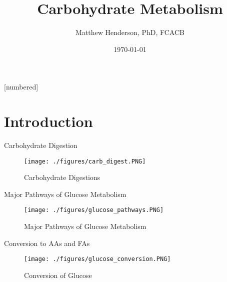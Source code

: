 \documentclass[presentation, smaller]{beamer}
\author{Matthew Henderson, PhD, FCACB}
\date{\today}
\title{Carbohydrate Metabolism}
\institute[NSO]{Newborn Screening Ontario | The University of Ottawa}
\begin{document}
\maketitle


\vspace{220pt}
\beamertemplatenavigationsymbolsempty
{}[numbered]

\section{Introduction}
\label{sec:orgfc30a68}
\begin{frame}[label={sec:orgbee72d6}]{Carbohydrate Digestion}
\begin{figure}[htbp]
\centering
\texttt{[image: ./figures/carb\_digest.PNG]}
\caption{\label{fig:orgc694711}
Carbohydrate Digestions}
\end{figure}
\end{frame}

\begin{frame}[label={sec:org608f721}]{Major Pathways of Glucose Metabolism}
\begin{figure}[htbp]
\centering
\texttt{[image: ./figures/glucose\_pathways.PNG]}
\caption{\label{fig:org5283a92}
Major Pathways of Glucose Metabolism}
\end{figure}
\end{frame}

\begin{frame}[label={sec:orgd4f606e}]{Conversion to AAs and FAs}
\begin{figure}[htbp]
\centering
\texttt{[image: ./figures/glucose\_conversion.PNG]}
\caption{\label{fig:org6b7d870}
Conversion of Glucose}
\end{figure}
\end{frame}
\end{document}
